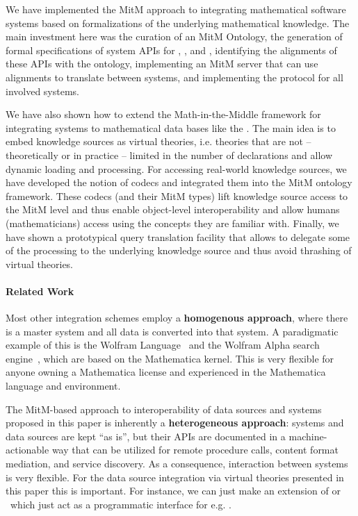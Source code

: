   We have implemented the MitM approach to integrating mathematical software systems based on formalizations of the underlying mathematical knowledge.
  The main investment here was the curation of an MitM Ontology, the generation of formal specifications of system APIs for \Sage, \GAP, and \Singular, identifying the alignments of these APIs with the ontology, implementing an MitM server that can use alignments to translate between systems, and implementing the \SCSCP protocol for all involved systems.

  We have also shown how to extend the Math-in-the-Middle framework for integrating systems to mathematical data bases like the \lmfdb. 
The main idea is to embed knowledge sources as virtual theories, i.e. theories that are not -- theoretically or in practice -- limited in the number of declarations and allow dynamic loading and processing. 
For accessing real-world knowledge sources, we have developed the notion of codecs and integrated them into the MitM ontology framework. 
These codecs (and their MitM types) lift knowledge source access to the MitM level and thus enable object-level interoperability and allow humans (mathematicians) access using the concepts they are familiar with. 
Finally, we have shown a prototypical query translation facility that allows to delegate some of the processing to the underlying knowledge source and thus avoid thrashing of virtual theories. 

\paragraph{Related Work} Most other integration schemes employ a \textbf{homogenous approach}, where there is a master system and all data is converted into that system. 
A paradigmatic example of this is the Wolfram Language~\cite{WolframLanguage:wikipedia} and the Wolfram Alpha search engine~\cite{WolframAlpha:on}, which are based on the Mathematica kernel. 
This is very flexible for anyone owning a Mathematica license and experienced in the Mathematica language and environment.

The MitM-based approach to interoperability of data sources and systems proposed in this paper is inherently a \textbf{heterogeneous approach}: systems and data sources are kept ``as is'', but their APIs are documented in a machine-actionable way that can be utilized for remote procedure calls, content format mediation, and service discovery. 
As a consequence, interaction between systems is very flexible.
For the data source integration via virtual theories presented in this paper this is important. 
For instance, we can just make an extension of \mmt or \Sage\ which just act as a programmatic interface for e.g. \lmfdb. 

